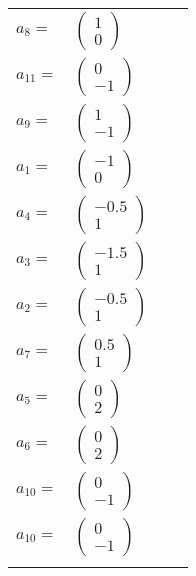 \documentclass[1p]{elsarticle_modified}
\theoremstyle{definition}
\begin{document}
\begin{tabular}{m{7pt} m{180pt} m{7pt} m{180pt} }
\flushright $a_{8}=$&$\begin{pmatrix}1\\0\end{pmatrix}$ \\
\flushright $a_{11}=$&$\begin{pmatrix}0\\-1\end{pmatrix}$ \\
\flushright $a_{9}=$&$\begin{pmatrix}1\\-1\end{pmatrix}$ \\
\flushright $a_{1}=$&$\begin{pmatrix}-1\\0\end{pmatrix}$ \\
\flushright $a_{4}=$&$\begin{pmatrix}-0.5\\1\end{pmatrix}$ \\
\flushright $a_{3}=$&$\begin{pmatrix}-1.5\\1\end{pmatrix}$ \\
\flushright $a_{2}=$&$\begin{pmatrix}-0.5\\1\end{pmatrix}$ \\
\flushright $a_{7}=$&$\begin{pmatrix}0.5\\1\end{pmatrix}$ \\
\flushright $a_{5}=$&$\begin{pmatrix}0\\2\end{pmatrix}$ \\
\flushright $a_{6}=$&$\begin{pmatrix}0\\2\end{pmatrix}$ \\
\flushright $a_{10}=$&$\begin{pmatrix}0\\-1\end{pmatrix}$\\ \flushright $a_{10}=$&$\begin{pmatrix}0\\-1\end{pmatrix}$\\&\end{tabular}
\end{document}
